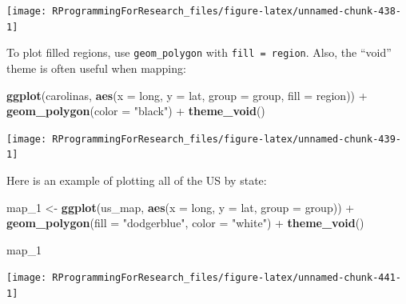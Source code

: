 \documentclass[]{book}
\makeatletter
\newenvironment{Shaded}{\begin{snugshade}}{\end{snugshade}}
\newcommand{\KeywordTok}[1]{\textcolor[rgb]{0.13,0.29,0.53}{\textbf{{#1}}}}
\newcommand{\DataTypeTok}[1]{\textcolor[rgb]{0.13,0.29,0.53}{{#1}}}
\newcommand{\StringTok}[1]{\textcolor[rgb]{0.31,0.60,0.02}{{#1}}}
\newcommand{\NormalTok}[1]{{#1}}
\newenvironment{kframe}{%
\medskip{}
\setlength{\fboxsep}{.8em}
 \def\at@end@of@kframe{}%
 \ifinner\ifhmode%
  \def\at@end@of@kframe{\end{minipage}}%
  \begin{minipage}{\columnwidth}%
 \fi\fi%
 \def\FrameCommand##1{\hskip\@totalleftmargin \hskip-\fboxsep
 \colorbox{shadecolor}{##1}\hskip-\fboxsep
     \hskip-\linewidth \hskip-\@totalleftmargin \hskip\columnwidth}%
 \MakeFramed {\advance\hsize-\width
   \@totalleftmargin\z@ \linewidth\hsize
   \@setminipage}}%
 {\par\unskip\endMakeFramed%
 \at@end@of@kframe}
\renewenvironment{Shaded}{\begin{kframe}}{\end{kframe}}
\makeatother
\begin{document}
\begin{center}\texttt{[image: RProgrammingForResearch\_files/figure-latex/unnamed-chunk-438-1]} \end{center}

To plot filled regions, use \texttt{geom\_polygon} with
\texttt{fill\ =\ region}. Also, the ``void'' theme is often useful when
mapping:

\begin{Shaded}
\begin{Highlighting}[]
\KeywordTok{ggplot}\NormalTok{(carolinas, }\KeywordTok{aes}\NormalTok{(}\DataTypeTok{x =} \NormalTok{long, }\DataTypeTok{y =} \NormalTok{lat,}
                      \DataTypeTok{group =} \NormalTok{group,}
                      \DataTypeTok{fill =} \NormalTok{region)) +}\StringTok{ }
\StringTok{  }\KeywordTok{geom_polygon}\NormalTok{(}\DataTypeTok{color =} \StringTok{"black"}\NormalTok{) +}\StringTok{ }
\StringTok{  }\KeywordTok{theme_void}\NormalTok{()}
\end{Highlighting}
\end{Shaded}

\begin{center}\texttt{[image: RProgrammingForResearch\_files/figure-latex/unnamed-chunk-439-1]} \end{center}

Here is an example of plotting all of the US by state:

\begin{Shaded}
\begin{Highlighting}[]
\NormalTok{map_1 <-}\StringTok{ }\KeywordTok{ggplot}\NormalTok{(us_map, }\KeywordTok{aes}\NormalTok{(}\DataTypeTok{x =} \NormalTok{long, }\DataTypeTok{y =} \NormalTok{lat,}
                            \DataTypeTok{group =} \NormalTok{group)) +}\StringTok{ }
\StringTok{        }\KeywordTok{geom_polygon}\NormalTok{(}\DataTypeTok{fill =} \StringTok{"dodgerblue"}\NormalTok{,}
                     \DataTypeTok{color =} \StringTok{"white"}\NormalTok{) +}
\StringTok{        }\KeywordTok{theme_void}\NormalTok{()}
\end{Highlighting}
\end{Shaded}

\begin{Shaded}
\begin{Highlighting}[]
\NormalTok{map_1}
\end{Highlighting}
\end{Shaded}

\begin{center}\texttt{[image: RProgrammingForResearch\_files/figure-latex/unnamed-chunk-441-1]} \end{center}
\end{document}
